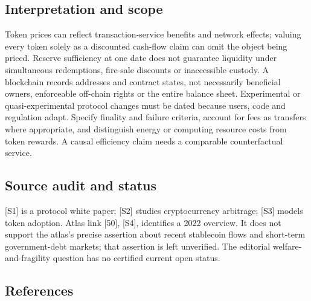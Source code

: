 \documentclass[11pt,a4paper]{article}
\begin{document}
\subsection*{Interpretation and scope}
Token prices can reflect transaction-service benefits and network effects; valuing every token solely as a discounted cash-flow claim can omit the object being priced. Reserve sufficiency at one date does not guarantee liquidity under simultaneous redemptions, fire-sale discounts or inaccessible custody. A blockchain records addresses and contract states, not necessarily beneficial owners, enforceable off-chain rights or the entire balance sheet. Experimental or quasi-experimental protocol changes must be dated because users, code and regulation adapt. Specify finality and failure criteria, account for fees as transfers where appropriate, and distinguish energy or computing resource costs from token rewards. A causal efficiency claim needs a comparable counterfactual service.

\subsection*{Source audit and status}
[S1] is a protocol white paper; [S2] studies cryptocurrency arbitrage; [S3] models token adoption. Atlas link [50], [S4], identifies a 2022 overview. It does not support the atlas’s precise assertion about recent stablecoin flows and short-term government-debt markets; that assertion is left unverified. The editorial welfare-and-fragility question has no certified current open status.

\subsection*{References}
\end{document}
